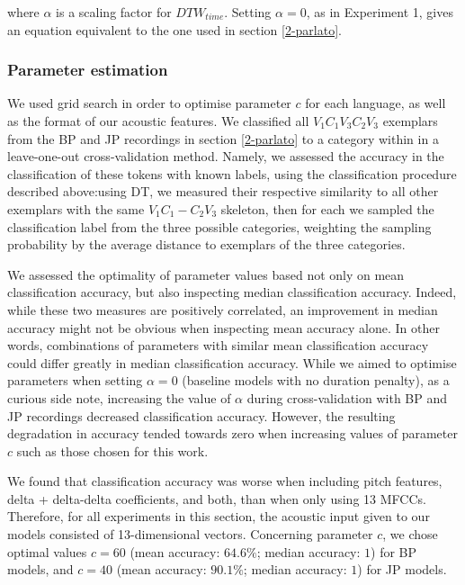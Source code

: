 where $\alpha$ is a scaling factor for $DTW_{time}$. Setting $\alpha = 0$, as in Experiment 1, gives an equation equivalent to the one used in section \ref{2-parlato}.

\subsubsection{Parameter estimation}
We used grid search in order to optimise parameter $c$ for each language, as well as the format of our acoustic features. We classified all $V_1C_1V_3C_2V_3$ exemplars from the BP and JP recordings in section \ref{2-parlato} to a category within  in a leave-one-out cross-validation method. Namely, we assessed the accuracy in the classification of these tokens with known labels, using the classification procedure described above:using DT, we measured their respective similarity to all other exemplars with the same $V_1C_1-C_2V_3$ skeleton, then for each we sampled the classification label from the three possible categories, weighting the sampling probability by the average distance to exemplars of the three categories.

We assessed the optimality of parameter values based not only on mean classification accuracy, but also inspecting median classification accuracy. Indeed, while these two measures are positively correlated, an improvement in median accuracy might not be obvious when inspecting mean accuracy alone. In other words, combinations of parameters with similar mean classification accuracy could differ greatly in median classification accuracy.
While we aimed to optimise parameters when setting $\alpha = 0$ (baseline models with no duration penalty), as a curious side note, increasing the value of $\alpha$ during cross-validation with BP and JP recordings decreased classification accuracy. However, the resulting degradation in accuracy tended towards zero when increasing values of parameter $c$ such as those chosen for this work.

We found that classification accuracy was worse when including pitch features, delta + delta-delta coefficients, and both, than when only using 13 MFCCs. Therefore, for all experiments in this section, the acoustic input given to our models consisted of 13-dimensional vectors. Concerning parameter $c$, we chose optimal values $c = 60$ (mean accuracy: $64.6\%$; median accuracy: $1$) for BP models, and $c = 40$ (mean accuracy: $90.1\%$; median accuracy: $1$) for JP models. 

